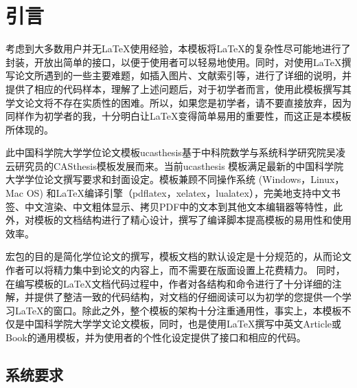 
\chapter{引言}
\label{chap:introduction}

考虑到大多数用户并无\LaTeX{}使用经验，本模板将\LaTeX{}的复杂性尽可能地进行了封装，开放出简单的接口，以便于使用者可以轻易地使用。同时，对使用\LaTeX{}撰写论文所遇到的一些主要难题，如插入图片、文献索引等，进行了详细的说明，并提供了相应的代码样本，理解了上述问题后，对于初学者而言，使用此模板撰写其学文论文将不存在实质性的困难。所以，如果您是初学者，请不要直接放弃，因为同样作为初学者的我，十分明白让\LaTeX{}变得简单易用的重要性，而这正是本模板所体现的。

此中国科学院大学学位论文模板ucasthesis基于中科院数学与系统科学研究院吴凌云研究员的CASthesis模板发展而来。当前ucasthesis 模板满足最新的中国科学院大学学位论文撰写要求和封面设定。模板兼顾不同操作系统 (Windows，Linux，Mac OS) 和\LaTeX{}编译引擎（pdflatex，xelatex，lualatex），完美地支持中文书签、中文渲染、中文粗体显示、拷贝PDF中的文本到其他文本编辑器等特性，此外，对模板的文档结构进行了精心设计，撰写了编译脚本提高模板的易用性和使用效率。

宏包的目的是简化学位论文的撰写，模板文档的默认设定是十分规范的，从而论文作者可以将精力集中到论文的内容上，而不需要在版面设置上花费精力。 同时，在编写模板的\LaTeX{}文档代码过程中，作者对各结构和命令进行了十分详细的注解，并提供了整洁一致的代码结构，对文档的仔细阅读可以为初学的您提供一个学习\LaTeX{}的窗口。除此之外，整个模板的架构十分注重通用性，事实上，本模板不仅是中国科学院大学学文论文模板，同时，也是使用\LaTeX{}撰写中英文Article或Book的通用模板，并为使用者的个性化设定提供了接口和相应的代码。

\section{系统要求}\label{sec:system}

